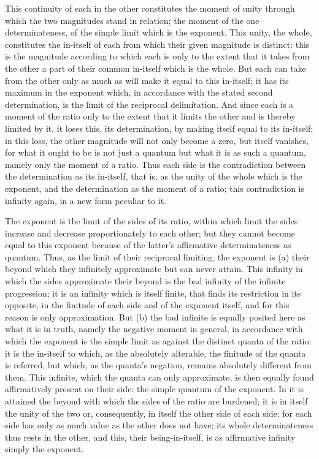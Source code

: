 This continuity of each in the other
constitutes the moment of unity
through which the two magnitudes stand in relation;
the moment of the one determinateness,
of the simple limit which is the exponent.
This unity, the whole, constitutes the in-itself
of each from which their given magnitude is distinct:
this is the magnitude according to which each is
only to the extent that it takes from the other
a part of their common in-itself which is the whole.
But each can take from the other only as much
as will make it equal to this in-itself;
it has its maximum in the exponent
which, in accordance with the stated second determination,
is the limit of the reciprocal delimitation.
And since each is a moment of the ratio only
to the extent that it limits the other
and is thereby limited by it,
it loses this, its determination,
by making itself equal to its in-itself;
in this loss, the other magnitude will not only
become a zero, but itself vanishes,
for what it ought to be is not just a quantum
but what it is as such a quantum,
namely only the moment of a ratio.
Thus each side is the contradiction
between the determination as its in-itself,
that is, as the unity of the whole which is the exponent,
and the determination as the moment of a ratio;
this contradiction is infinity again,
in a new form peculiar to it.

The exponent is the limit of the sides of its ratio,
within which limit the sides increase and decrease
proportionately to each other;
but they cannot become equal to this exponent
because of the latter's affirmative determinateness as quantum.
Thus, as the limit of their reciprocal limiting,
the exponent is (a) their beyond which they
infinitely approximate but can never attain.
This infinity in which the sides approximate their beyond is
the bad infinity of the infinite progression;
it is an infinity which is itself finite,
that finds its restriction in its opposite,
in the finitude of each side
and of the exponent itself,
and for this reason is only approximation.
But (b) the bad infinite is equally posited here
as what it is in truth, namely
the negative moment in general,
in accordance with which the exponent
is the simple limit as against the distinct quanta of the ratio:
it is the in-itself to which, as the absolutely alterable,
the finitude of the quanta is referred,
but which, as the quanta's negation,
remains absolutely different from them.
This infinite, which the quanta can only approximate,
is then equally found affirmatively present on their side:
the simple quantum of the exponent.
In it is attained the beyond with which
the sides of the ratio are burdened;
it is in itself the unity of the two or, consequently,
in itself the other side of each side;
for each side has only as much value
as the other does not have;
its whole determinateness thus rests in the other,
and this, their being-in-itself, is as affirmative infinity
simply the exponent.


